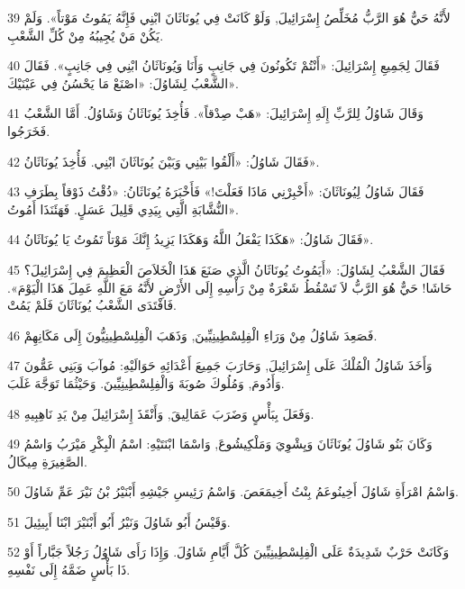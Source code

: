 \par 39 لأَنَّهُ حَيٌّ هُوَ الرَّبُّ مُخَلِّصُ إِسْرَائِيلَ, وَلَوْ كَانَتْ فِي يُونَاثَانَ ابْنِي فَإِنَّهُ يَمُوتُ مَوْتاً». وَلَمْ يَكُنْ مَنْ يُجِيبُهُ مِنْ كُلِّ الشَّعْبِ.
\par 40 فَقَالَ لِجَمِيعِ إِسْرَائِيلَ: «أَنْتُمْ تَكُونُونَ فِي جَانِبٍ وَأَنَا وَيُونَاثَانُ ابْنِي فِي جَانِبٍ». فَقَالَ الشَّعْبُ لِشَاوُلَ: «اصْنَعْ مَا يَحْسُنُ فِي عَيْنَيْكَ».
\par 41 وَقَالَ شَاوُلُ لِلرَّبِّ إِلَهِ إِسْرَائِيلَ: «هَبْ صِدْقاً». فَأُخِذَ يُونَاثَانُ وَشَاوُلُ. أَمَّا الشَّعْبُ فَخَرَجُوا.
\par 42 فَقَالَ شَاوُلُ: «أَلْقُوا بَيْنِي وَبَيْنَ يُونَاثَانَ ابْنِي. فَأُخِذَ يُونَاثَانُ».
\par 43 فَقَالَ شَاوُلُ لِيُونَاثَانَ: «أَخْبِرْنِي مَاذَا فَعَلْتَ!» فَأَخْبَرَهُ يُونَاثَانُ: «ذُقْتُ ذَوْقاً بِطَرَفِ النُّشَّابَةِ الَّتِي بِيَدِي قَلِيلَ عَسَلٍ. فَهَئَنَذَا أَمُوتُ».
\par 44 فَقَالَ شَاوُلُ: «هَكَذَا يَفْعَلُ اللَّهُ وَهَكَذَا يَزِيدُ إِنَّكَ مَوْتاً تَمُوتُ يَا يُونَاثَانُ».
\par 45 فَقَالَ الشَّعْبُ لِشَاوُلَ: «أَيَمُوتُ يُونَاثَانُ الَّذِي صَنَعَ هَذَا الْخَلاَصَ الْعَظِيمَ فِي إِسْرَائِيلَ؟ حَاشَا! حَيٌّ هُوَ الرَّبُّ لاَ تَسْقُطُ شَعْرَةٌ مِنْ رَأْسِهِ إِلَى الأَرْضِ لأَنَّهُ مَعَ اللَّهِ عَمِلَ هَذَا الْيَوْمَ». فَافْتَدَى الشَّعْبُ يُونَاثَانَ فَلَمْ يَمُتْ.
\par 46 فَصَعِدَ شَاوُلُ مِنْ وَرَاءِ الْفِلِسْطِينِيِّينَ, وَذَهَبَ الْفِلِسْطِينِيُّونَ إِلَى مَكَانِهِمْ.
\par 47 وَأَخَذَ شَاوُلُ الْمُلْكَ عَلَى إِسْرَائِيلَ, وَحَارَبَ جَمِيعَ أَعْدَائِهِ حَوَالَيْهِ: مُوآبَ وَبَنِي عَمُّونَ وَأَدُومَ, وَمُلُوكَ صُوبَةَ وَالْفِلِسْطِينِيِّينَ. وَحَيْثُمَا تَوَجَّهَ غَلَبَ.
\par 48 وَفَعَلَ بِبَأْسٍ وَضَرَبَ عَمَالِيقَ, وَأَنْقَذَ إِسْرَائِيلَ مِنْ يَدِ نَاهِبِيهِ.
\par 49 وَكَانَ بَنُو شَاوُلَ يُونَاثَانَ وَيِشْوِيَ وَمَلْكِيشُوعَ, وَاسْمَا ابْنَتَيْهِ: اسْمُ الْبِكْرِ مَيْرَبُ وَاسْمُ الصَّغِيرَةِ مِيكَالُ.
\par 50 وَاسْمُ امْرَأَةِ شَاوُلَ أَخِينُوعَمُ بِنْتُ أَخِيمَعَصَ. وَاسْمُ رَئِيسِ جَيْشِهِ أَبْنَيْرُ بْنُ نَيْرَ عَمِّ شَاوُلَ.
\par 51 وَقَيْسُ أَبُو شَاوُلَ وَنَيْرُ أَبُو أَبْنَيْرَ ابْنَا أَبِيئِيلَ.
\par 52 وَكَانَتْ حَرْبٌ شَدِيدَةٌ عَلَى الْفِلِسْطِينِيِّينَ كُلَّ أَيَّامِ شَاوُلَ. وَإِذَا رَأَى شَاوُلُ رَجُلاً جَبَّاراً أَوْ ذَا بَأْسٍ ضَمَّهُ إِلَى نَفْسِهِ.

